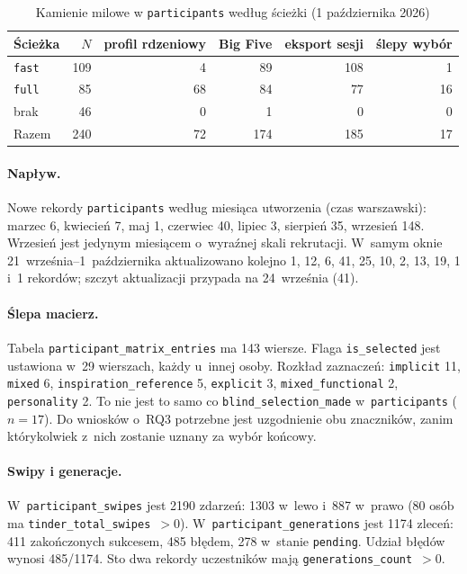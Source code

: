 \begin{table}[ht]
  \centering
  \caption{Kamienie milowe w \texttt{participants} według ścieżki (1 października 2026)}
  \label{tab:ch08:path-2026-10-01}
  \begin{tabular}{lrrrrr}
    \toprule
    Ścieżka & $N$ & profil rdzeniowy & Big Five & eksport sesji & ślepy wybór \\
    \midrule
    \texttt{fast} & 109 & 4 & 89 & 108 & 1 \\
    \texttt{full} & 85 & 68 & 84 & 77 & 16 \\
    brak & 46 & 0 & 1 & 0 & 0 \\
    \midrule
    Razem & 240 & 72 & 174 & 185 & 17 \\
    \bottomrule
  \end{tabular}
\end{table}

\paragraph{Napływ.}
Nowe rekordy \texttt{participants} według miesiąca utworzenia (czas warszawski): marzec 6, kwiecień 7, maj 1, czerwiec 40, lipiec 3, sierpień 35, wrzesień 148. Wrzesień jest jedynym miesiącem o~wyraźnej skali rekrutacji. W~samym oknie 21~września--1~października aktualizowano kolejno 1, 12, 6, 41, 25, 10, 2, 13, 19, 1 i~1 rekordów; szczyt aktualizacji przypada na 24~września (41).

\paragraph{Ślepa macierz.}
Tabela \texttt{participant\_matrix\_entries} ma 143 wiersze. Flaga \texttt{is\_selected} jest ustawiona w~29 wierszach, każdy u~innej osoby. Rozkład zaznaczeń: \texttt{implicit} 11, \texttt{mixed} 6, \texttt{inspiration\_reference} 5, \texttt{explicit} 3, \texttt{mixed\_functional} 2, \texttt{personality} 2. To nie jest to samo co \texttt{blind\_selection\_made} w~\texttt{participants} ($n=17$). Do wniosków o~RQ3 potrzebne jest uzgodnienie obu znaczników, zanim którykolwiek z~nich zostanie uznany za wybór końcowy.

\paragraph{Swipy i generacje.}
W~\texttt{participant\_swipes} jest 2190 zdarzeń: 1303 w~lewo i~887 w~prawo (80 osób ma \texttt{tinder\_total\_swipes}~$>0$). W~\texttt{participant\_generations} jest 1174 zleceń: 411 zakończonych sukcesem, 485 błędem, 278 w~stanie \texttt{pending}. Udział błędów wynosi 485/1174. Sto dwa rekordy uczestników mają \texttt{generations\_count}~$>0$.

